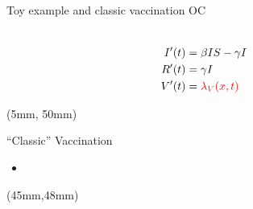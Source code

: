 \begin{frame}{Toy example and classic vaccination OC}
\begin{textblock*}{65mm}
{\begin{equation*}
\begin{aligned}
                    \\
                    I'(t) &=  \beta IS - \gamma I
                    \\
                    R'(t) & = \gamma I
                    \\
                    V'(t) & = \textcolor{red}{\lambda_V(x,t)}
                \end{aligned}
            \end{equation*}
        }
    \end{textblock*}
    \begin{textblock*}{28mm}(5mm, 50mm)
        \begin{block}{``Classic'' Vaccination}
            \begin{itemize}
                \item

            \end{itemize}
        \end{block}
    \end{textblock*}
    \begin{textblock*}{80mm}(45mm,48mm)
    \end{textblock*}
 \end{frame}
